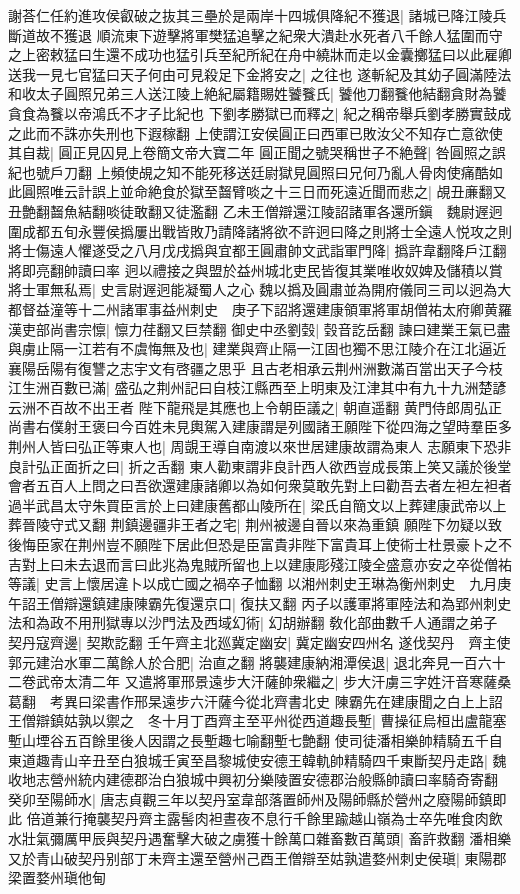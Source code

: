 謝荅仁任約進攻侯叡破之抜其三壘於是兩岸十四城俱降紀不獲退|{
	諸城已降江陵兵斷道故不獲退}
順流東下遊擊將軍樊猛追擊之紀衆大潰赴水死者八千餘人猛圍而守之上密敕猛曰生還不成功也猛引兵至紀所紀在舟中繞牀而走以金囊擲猛曰以此雇卿送我一見七官猛曰天子何由可見殺足下金將安之|{
	之往也}
遂斬紀及其幼子圓滿陸法和收太子圓照兄弟三人送江陵上絶紀屬籍賜姓饕餮氏|{
	饕他刀翻餮他結翻貪財為饕貪食為餮以帝鴻氏不才子比紀也}
下劉孝勝獄已而釋之|{
	紀之稱帝舉兵劉孝勝實鼓成之此而不誅亦失刑也下遐稼翻}
上使謂江安侯圓正曰西軍已敗汝父不知存亡意欲使其自裁|{
	圓正見囚見上卷簡文帝大寶二年}
圓正聞之號哭稱世子不絶聲|{
	咎圓照之誤紀也號戶刀翻}
上頻使覘之知不能死移送廷尉獄見圓照曰兄何乃亂人骨肉使痛酷如此圓照唯云計誤上並命絶食於獄至齧臂啖之十三日而死遠近聞而悲之|{
	覘丑亷翻又丑艶翻齧魚結翻啖徒敢翻又徒濫翻}
乙未王僧辯還江陵詔諸軍各還所鎭　魏尉遟迥圍成都五旬永豐侯撝屢出戰皆敗乃請降諸將欲不許迥曰降之則將士全遠人悦攻之則將士傷遠人懼遂受之八月戊戌撝與宜都王圓肅帥文武詣軍門降|{
	撝許韋翻降戶江翻將即亮翻帥讀曰率}
迥以禮接之與盟於益州城北吏民皆復其業唯收奴婢及儲積以賞將士軍無私焉|{
	史言尉遟迥能凝蜀人之心}
魏以撝及圓肅並為開府儀同三司以迥為大都督益潼等十二州諸軍事益州刺史　庚子下詔將還建康領軍將軍胡僧祐太府卿黄羅漢吏部尚書宗懔|{
	懔力荏翻又巨禁翻}
御史中丞劉㲄|{
	㲄音訖岳翻}
諫曰建業王氣已盡與虜止隔一江若有不虞悔無及也|{
	建業與齊止隔一江固也獨不思江陵介在江北逼近襄陽岳陽有復讐之志宇文有啓疆之思乎}
且古老相承云荆州洲數滿百當出天子今枝江生洲百數已滿|{
	盛弘之荆州記曰自枝江縣西至上明東及江津其中有九十九洲楚諺云洲不百故不出王者}
陛下龍飛是其應也上令朝臣議之|{
	朝直遥翻}
黄門侍郎周弘正尚書右僕射王褒曰今百姓未見輿駕入建康謂是列國諸王願陛下從四海之望時羣臣多荆州人皆曰弘正等東人也|{
	周覬王導自南渡以來世居建康故謂為東人}
志願東下恐非良計弘正面折之曰|{
	折之舌翻}
東人勸東謂非良計西人欲西豈成長策上笑又議於後堂會者五百人上問之曰吾欲還建康諸卿以為如何衆莫敢先對上曰勸吾去者左袒左袒者過半武昌太守朱買臣言於上曰建康舊都山陵所在|{
	梁氏自簡文以上葬建康武帝以上葬晉陵守式又翻}
荆鎮邊疆非王者之宅|{
	荆州被邊自晉以來為重鎮}
願陛下勿疑以致後悔臣家在荆州豈不願陛下居此但恐是臣富貴非陛下富貴耳上使術士杜景豪卜之不吉對上曰未去退而言曰此兆為鬼賊所留也上以建康彫殘江陵全盛意亦安之卒從僧祐等議|{
	史言上懷居違卜以成亡國之禍卒子恤翻}
以湘州刺史王琳為衡州刺史　九月庚午詔王僧辯還鎮建康陳霸先復還京口|{
	復扶又翻}
丙子以護軍將軍陸法和為郢州刺史法和為政不用刑獄專以沙門法及西域幻術|{
	幻胡辦翻}
敎化部曲數千人通謂之弟子　契丹寇齊邊|{
	契欺訖翻}
壬午齊主北廵冀定幽安|{
	冀定幽安四州名}
遂伐契丹　齊主使郭元建治水軍二萬餘人於合肥|{
	治直之翻}
將襲建康納湘潭侯退|{
	退北奔見一百六十二卷武帝太清二年}
又遣將軍邢景遠步大汗薩帥衆繼之|{
	步大汗虜三字姓汗音寒薩桑葛翻　考異曰梁書作邢杲遠步六汗薩今從北齊書北史}
陳霸先在建康聞之白上上詔王僧辯鎮姑孰以禦之　冬十月丁酉齊主至平州從西道趣長塹|{
	曹操征烏桓出盧龍塞塹山堙谷五百餘里後人因謂之長塹趣七喻翻塹七艶翻}
使司徒潘相樂帥精騎五千自東道趣青山辛丑至白狼城壬寅至昌黎城使安德王韓軌帥精騎四千東斷契丹走路|{
	魏收地志營州統内建德郡治白狼城中興初分樂陵置安德郡治般縣帥讀曰率騎奇寄翻}
癸卯至陽師水|{
	唐志貞觀三年以契丹室韋部落置師州及陽師縣於營州之廢陽師鎮即此}
倍道兼行掩襲契丹齊主露髻肉袒晝夜不息行千餘里踰越山嶺為士卒先唯食肉飲水壯氣彌厲甲辰與契丹遇奮擊大破之虜獲十餘萬口雜畜數百萬頭|{
	畜許救翻}
潘相樂又於青山破契丹别部丁未齊主還至營州己酉王僧辯至姑孰遣婺州刺史侯瑱|{
	東陽郡梁置婺州瑱他甸}


